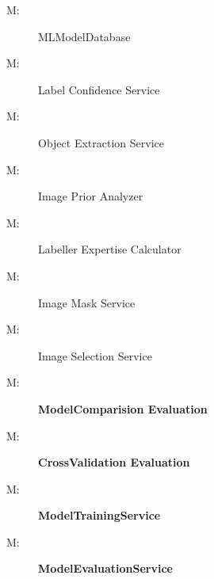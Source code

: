 \documentclass[12pt, titlepage]{article}
\newcounter{mnum}
\newcommand{\mthemnum}{M\themnum}
\begin{document}
\begin{description}
  \item [ \mthemnum \label{mlmodeldatabase}:]
    MLModelDatabase
\item [ \mthemnum \label{Label Confidence Service}:]Label Confidence Service
\item [ \mthemnum \label{Object Extraction Service}:]Object Extraction Service
\item [ \mthemnum \label{Image Prior Analyzer}:]Image Prior Analyzer
\item [ \mthemnum \label{Labeller Expertise Calculator}:]Labeller Expertise Calculator
\item [ \mthemnum \label{Image Mask Service}:]Image Mask Service
\item [ \mthemnum \label{Image Selection Service}:]Image Selection Service
  \item [ \mthemnum \label{modelcomparison}:]
    \textbf{ModelComparision Evaluation}

  \item [ \mthemnum \label{crossvalidation}:]
    \textbf{CrossValidation Evaluation}

  \item [ \mthemnum \label{modeltrainingservice}:]
    \textbf{ModelTrainingService}

  \item [ \mthemnum \label{modelevaluationservice}:]
    \textbf{ModelEvaluationService}

\end{description}


  
\end{document}
